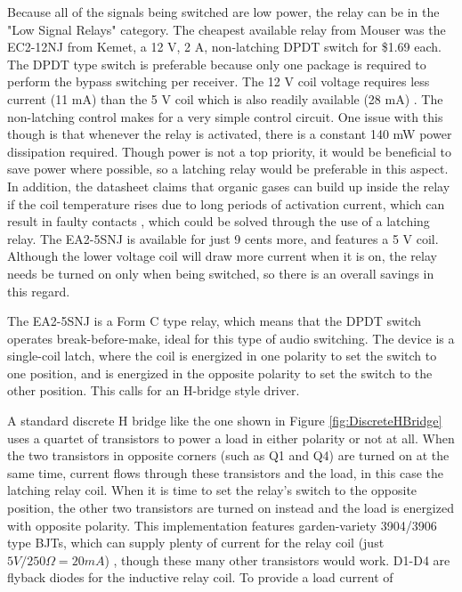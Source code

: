 \documentclass{article}
\begin{document}
		Because all of the signals being switched are low power, the relay can be in the "Low Signal Relays" category.  The cheapest available relay from Mouser was the EC2-12NJ from Kemet, a 12 V, 2 A, non-latching DPDT switch for \$1.69 each.  The DPDT type switch is preferable because only one package is required to perform the bypass switching per receiver.  The 12 V coil voltage requires less current (11 mA) than the 5 V coil which is also readily available (28 mA) \cite{EC2datasheet}.  The non-latching control makes for a very simple control circuit.  One issue with this though is that whenever the relay is activated, there is a constant 140 mW power dissipation required.  Though power is not a top priority, it would be beneficial to save power where possible, so a latching relay would be preferable in this aspect.  In addition, the datasheet claims that organic gases can build up inside the relay if the coil temperature rises due to long periods of activation current, which can result in faulty contacts \cite{EA2datasheet}, which could be solved through the use of a latching relay.  The EA2-5SNJ is available for just 9 cents more, and features a 5 V coil.  Although the lower voltage coil will draw more current when it is on, the relay needs be turned on only when being switched, so there is an overall savings in this regard.

		The EA2-5SNJ is a Form C type relay, which means that the DPDT switch operates break-before-make, ideal for this type of audio switching.  The device is a single-coil latch, where the coil is energized in one polarity to set the switch to one position, and is energized in the opposite polarity to set the switch to the other position.  This calls for an H-bridge style driver.

		A standard discrete H bridge like the one shown in Figure \ref{fig:DiscreteHBridge} uses a quartet of transistors to power a load in either polarity or not at all.  When the two transistors in opposite corners (such as Q1 and Q4) are turned on at the same time, current flows through these transistors and the load, in this case the latching relay coil.  When it is time to set the relay's switch to the opposite position, the other two transistors are turned on instead and the load is energized with opposite polarity.  This implementation features garden-variety 3904/3906 type BJTs, which can supply plenty of current for the relay coil (just $5V/250\Omega = 20 mA$) \cite{EA2datasheet}\cite{2N3904datasheet}\cite{2N3906datasheet}, though these many other transistors would work.  D1-D4 are flyback diodes for the inductive relay coil.  To provide a load current of 
\end{document}
